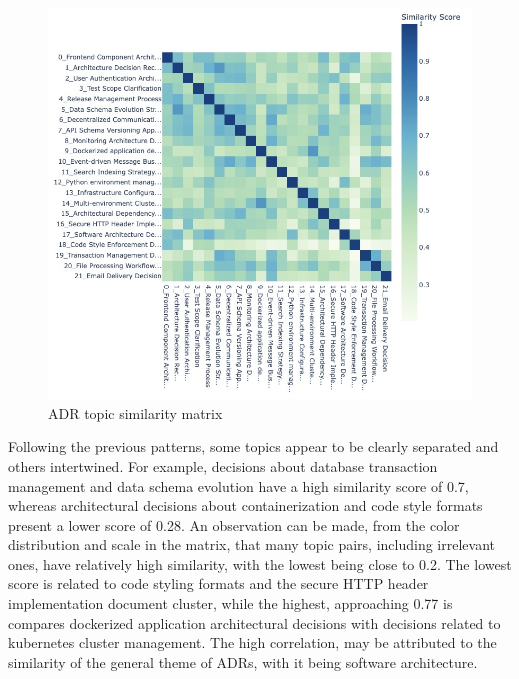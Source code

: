         \begin{figure}[h]
            \centering
            \hspace*{-2cm} 
            \includegraphics[scale=0.55]{figures/No Titles/heatmap_original_no_title.jpeg}
            \caption{ADR topic similarity matrix}
            \label{fig:similarity_matrix_orginal}
        \end{figure}
        
        Following the previous patterns, some topics appear to be clearly separated and others intertwined. For example, decisions about database transaction management and data schema evolution have a high similarity score of 0.7, whereas architectural decisions about containerization and code style formats present a lower score of 0.28. An observation can be made, from the color distribution and scale in the matrix, that many topic pairs, including irrelevant ones, have relatively high similarity, with the lowest being close to 0.2. The lowest score is related to code styling formats and the secure HTTP header implementation document cluster, while the highest, approaching 0.77 is compares dockerized application architectural decisions with decisions related to kubernetes cluster management. The high correlation, may be attributed to the similarity of the general theme of ADRs, with it being software architecture.

